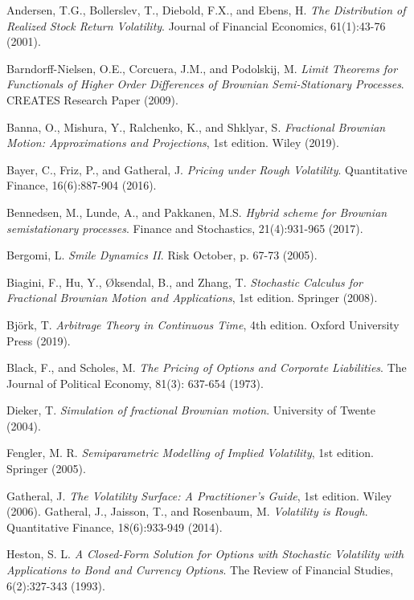 \documentclass[11pt,a4paper,twoside,openright,english]{book}
\begin{document}
%
%
\begin{thebibliography}{}
Andersen, T.G., Bollerslev, T., Diebold, F.X., and Ebens, H. \textit{The Distribution of Realized Stock Return Volatility}. Journal of Financial Economics, 61(1):43-76 (2001).

Barndorff-Nielsen, O.E., Corcuera, J.M., and Podolskij, M. \textit{Limit Theorems for Functionals of Higher Order Differences of Brownian Semi-Stationary Processes}. CREATES Research Paper (2009).

Banna, O., Mishura, Y., Ralchenko, K., and Shklyar, S. \textit{Fractional Brownian Motion: Approximations and Projections}, 1st edition. Wiley (2019).

Bayer, C., Friz, P., and Gatheral, J. \textit{Pricing under Rough Volatility}. Quantitative Finance, 16(6):887-904 (2016).

Bennedsen, M., Lunde, A., and Pakkanen, M.S. \textit{Hybrid scheme for Brownian semistationary processes}. Finance and Stochastics, 21(4):931-965 (2017).

Bergomi, L. \textit{Smile Dynamics II}. Risk October, p. 67-73 (2005).

Biagini, F., Hu, Y., Øksendal, B., and Zhang, T. \textit{Stochastic Calculus for Fractional Brownian Motion and Applications}, 1st edition. Springer (2008).

Björk, T. \textit{Arbitrage Theory in Continuous Time}, 4th edition. Oxford University Press (2019).

Black, F., and Scholes, M. \textit{The Pricing of Options and Corporate Liabilities}. The Journal of Political Economy, 81(3): 637-654 (1973).

Dieker, T. \textit{Simulation of fractional Brownian motion}. University of Twente (2004).

Fengler, M. R. \textit{Semiparametric Modelling of Implied Volatility}, 1st edition. Springer (2005).

Gatheral, J. \textit{The Volatility Surface: A Practitioner's Guide}, 1st edition. Wiley (2006).
Gatheral, J., Jaisson, T., and Rosenbaum, M. \textit{Volatility is Rough}. Quantitative Finance, 18(6):933-949 (2014).

Heston, S. L. \textit{A Closed-Form Solution for Options with Stochastic Volatility with Applications to Bond and Currency Options}. The Review of Financial Studies, 6(2):327-343 (1993).


\end{thebibliography}
\end{document}
